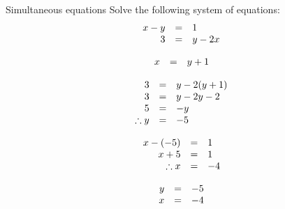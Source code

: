 \begin{wex}
{Simultaneous equations }
{
Solve the following system of equations:
\begin{equation*}
\begin{array}{ccl}\hfill x-y& =& 1\hfill \\ \hfill 3& =& y-2x\hfill \end{array}
\end{equation*}
}
{
\begin{equation*}
    \begin{array}{ccl}\hfill x& =& y+1\hfill 
    \end{array}
\end{equation*}

\begin{equation*}
    \begin{array}{ccl}\hfill 3& =& y-2(y+1)\hfill \\
	\hfill 3& =& y - 2y - 2\hfill \\
	\hfill 5& =& -y\hfill \\
\hfill \therefore y& =& -5\hfill
    \end{array}
\end{equation*}

\begin{equation*}
    \begin{array}{ccl}\hfill x - (-5)& =& 1\hfill \\
	\hfill x+ 5& =& 1\hfill \\
\hfill \therefore x& =& -4\hfill
    \end{array}
\end{equation*}


\begin{equation*}
\begin{array}{ccl}\hfill y& =& -5\hfill \\
 \hfill x& =& -4\hfill 
\end{array}
\end{equation*}
}
\end{wex}

